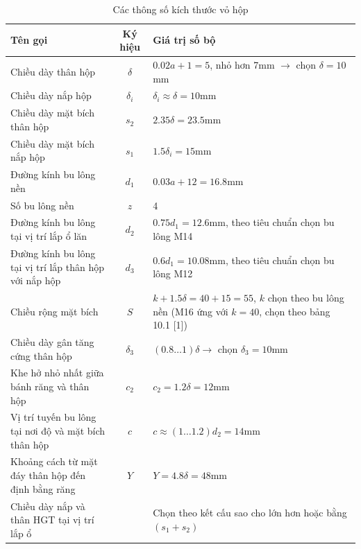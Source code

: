 \begin{table}[H]
    \centering
    \begin{tabular}{|p{5cm}|c|p{7cm}|} %
    \hline
    \textbf{Tên gọi} & \textbf{Ký hiệu} & \textbf{Giá trị số bộ} \\
    \hline
    Chiều dày thân hộp & $\delta$ & $0.02a + 1 = 5$, nhỏ hơn 7mm $\rightarrow$ chọn $\delta = 10$mm \\
    \hline
    Chiều dày nắp hộp & $\delta_i$ & $\delta_i \approx \delta = 10$mm \\
    \hline
    Chiều dày mặt bích thân hộp & $s_2$ & $2.35\delta = 23.5$mm \\
    \hline
    Chiều dày mặt bích nắp hộp & $s_1$ & $1.5\delta_i = 15$mm \\
    \hline
    Đường kính bu lông nền & $d_1$ & $0.03a + 12 = 16.8$mm \\
    \hline
    Số bu lông nền & $z$ & 4 \\
    \hline
    Đường kính bu lông tại vị trí lắp ổ lăn & $d_2$ & $0.75d_1 = 12.6$mm, theo tiêu chuẩn chọn bu lông M14 \\
    \hline
    Đường kính bu lông tại vị trí lắp thân hộp với nắp hộp & $d_3$ & $0.6d_1 = 10.08$mm, theo tiêu chuẩn chọn bu lông M12 \\
    \hline
    Chiều rộng mặt bích & $S$ & $k + 1.5\delta = 40 + 15 = 55$, $k$ chọn theo bu lông nền (M16 ứng với $k=40$, chọn theo bảng 10.1 [1]) \\
    \hline
    Chiều dày gân tăng cứng thân hộp & $\delta_3$ & $(0.8 \ldots 1)\delta \rightarrow$ chọn $\delta_3 = 10$mm \\
    \hline
    Khe hở nhỏ nhất giữa bánh răng và thân hộp & $c_2$ & $c_2 = 1.2\delta = 12$mm \\
    \hline
    Vị trí tuyến bu lông tại nơi độ và mặt bích thân hộp & $c$ & $c \approx (1 \ldots 1.2)d_2 = 14$mm \\
    \hline
    Khoảng cách từ mặt đáy thân hộp đến định bằng răng & $Y$ & $Y = 4.8\delta = 48$mm \\
    \hline
    Chiều dày nắp và thân HGT tại vị trí lắp ổ & & Chọn theo kết cấu sao cho lớn hơn hoặc bằng $(s_1 + s_2)$ \\
    \hline
    \end{tabular}
    \caption{Các thông số kích thước vỏ hộp}
    \end{table}
